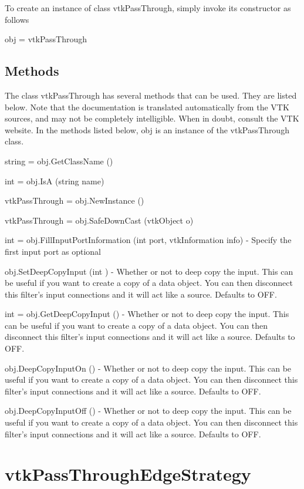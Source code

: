To create an instance of class vtk\-Pass\-Through, simply invoke its constructor as follows \begin{DoxyVerb}  obj = vtkPassThrough
\end{DoxyVerb}
 \hypertarget{vtkwidgets_vtkxyplotwidget_Methods}{}\subsection{Methods}\label{vtkwidgets_vtkxyplotwidget_Methods}
The class vtk\-Pass\-Through has several methods that can be used. They are listed below. Note that the documentation is translated automatically from the V\-T\-K sources, and may not be completely intelligible. When in doubt, consult the V\-T\-K website. In the methods listed below, {\ttfamily obj} is an instance of the vtk\-Pass\-Through class. 
\begin{DoxyItemize}
\item {\ttfamily string = obj.\-Get\-Class\-Name ()}  
\item {\ttfamily int = obj.\-Is\-A (string name)}  
\item {\ttfamily vtk\-Pass\-Through = obj.\-New\-Instance ()}  
\item {\ttfamily vtk\-Pass\-Through = obj.\-Safe\-Down\-Cast (vtk\-Object o)}  
\item {\ttfamily int = obj.\-Fill\-Input\-Port\-Information (int port, vtk\-Information info)} -\/ Specify the first input port as optional  
\item {\ttfamily obj.\-Set\-Deep\-Copy\-Input (int )} -\/ Whether or not to deep copy the input. This can be useful if you want to create a copy of a data object. You can then disconnect this filter's input connections and it will act like a source. Defaults to O\-F\-F.  
\item {\ttfamily int = obj.\-Get\-Deep\-Copy\-Input ()} -\/ Whether or not to deep copy the input. This can be useful if you want to create a copy of a data object. You can then disconnect this filter's input connections and it will act like a source. Defaults to O\-F\-F.  
\item {\ttfamily obj.\-Deep\-Copy\-Input\-On ()} -\/ Whether or not to deep copy the input. This can be useful if you want to create a copy of a data object. You can then disconnect this filter's input connections and it will act like a source. Defaults to O\-F\-F.  
\item {\ttfamily obj.\-Deep\-Copy\-Input\-Off ()} -\/ Whether or not to deep copy the input. This can be useful if you want to create a copy of a data object. You can then disconnect this filter's input connections and it will act like a source. Defaults to O\-F\-F.  
\end{DoxyItemize}\hypertarget{vtkinfovis_vtkpassthroughedgestrategy}{}\section{vtk\-Pass\-Through\-Edge\-Strategy}\label{vtkinfovis_vtkpassthroughedgestrategy}
